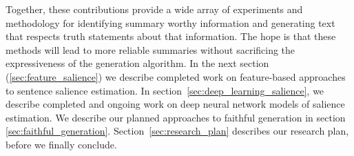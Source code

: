 
Together, these contributions
provide a wide array of experiments and  methodology for identifying summary worthy information and 
generating text that respects truth statements about that information.
The hope is that these methods will lead to more reliable summaries
without sacrificing the expressiveness of the generation algorithm. 
In the next section (\autoref{sec:feature_salience}) 
we describe completed work on feature-based approaches to sentence salience estimation. 
In section~\ref{sec:deep_learning_salience}, we describe completed and ongoing
 work on deep neural network models
of salience estimation. We describe our planned approaches to faithful 
generation in section \ref{sec:faithful_generation}. 
Section~\ref{sec:research_plan} describes our research plan, before 
we finally conclude.






